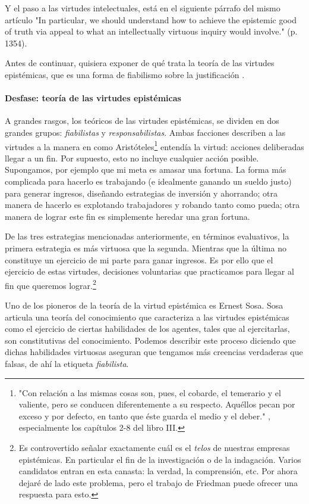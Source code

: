 Y el paso a las virtudes intelectuales, está en el siguiente párrafo del mismo artículo "In particular, we should understand how to achieve the epistemic good of truth via appeal to what an intellectually virtuous inquiry would involve." (p. 1354).

Antes de continuar, quisiera exponer de qué trata la teoría de las virtudes epistémicas, que es una forma de fiabilismo sobre la justificación \parencite{klein2019}.

\paragraph{Desfase: teoría de las virtudes epistémicas}

A grandes rasgos, los teóricos de las virtudes epistémicas, se dividen en dos grandes grupos: \emph{fiabilistas} y \emph{responsabilistas}.
Ambas facciones describen a las virtudes a la manera en como Aristóteles\footnote{"Con relación a las mismas cosas son, pues, el cobarde, el temerario y el valiente, pero se conducen diferentemente a su respecto. Aquéllos pecan por exceso y por defecto, en tanto que éste guarda el medio y el deber." \parencite{aristoteles2012}, especialmente los capítulos 2-8 del libro III.}
entendía la virtud: acciones deliberadas llegar a un fin.
Por supuesto, esto no incluye cualquier acción posible.
Supongamos, por ejemplo que mi meta es amasar una fortuna.
La forma más complicada para hacerlo es trabajando (e idealmente ganando un sueldo justo) para generar ingresos, diseñando estrategias de inversión y ahorrando; otra manera de hacerlo es explotando trabajadores y robando tanto como pueda; otra manera de lograr este fin es simplemente heredar una gran fortuna.

De las tres estrategias mencionadas anteriormente, en términos evaluativos, la primera estrategia es más virtuosa que la segunda.
Mientras que la última no constituye un ejercicio de mi parte para ganar ingresos.
Es por ello que el ejercicio de estas virtudes, decisiones voluntarias que practicamos para llegar al fin que queremos lograr.\footnote{Es controvertido señalar exactamente cuál es el \emph{telos} de nuestras empresas epistémicas. En particular el fin de la investigación o de la indagación. Varios candidatos entran en esta canasta: la verdad, la comprensión, etc. Por ahora dejaré de lado este problema, pero el trabajo de Friedman puede ofrecer una respuesta para esto.}

Uno de los pioneros de la teoría de la virtud epistémica es Ernest Sosa.
Sosa \parencite{sosa2017} articula una teoría del conocimiento que caracteriza a las virtudes epistémicas como el ejercicio de ciertas habilidades de los agentes, tales que al ejercitarlas, son constitutivas del conocimiento.
Podemos describir este proceso diciendo que dichas habilidades virtuosas aseguran que tengamos más creencias verdaderas que falsas, de ahí la etiqueta \emph{fiabilista}.

